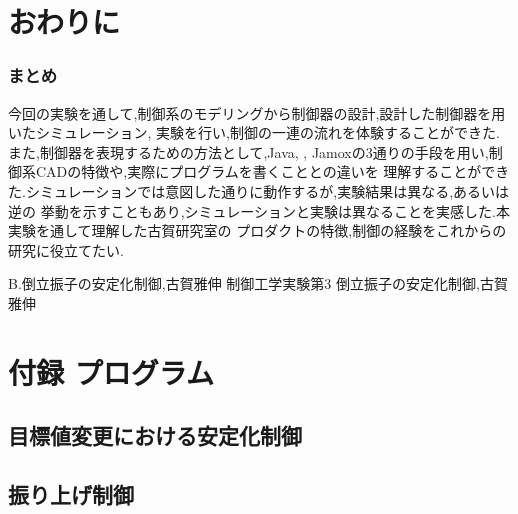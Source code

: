 \chapter{おわりに}
\subsection{まとめ}
今回の実験を通して,制御系のモデリングから制御器の設計,設計した制御器を用いたシミュレーション,
実験を行い,制御の一連の流れを体験することができた.また,制御器を表現するための方法として,Java,
\MaTX{}, Jamoxの3通りの手段を用い,制御系CADの特徴や,実際にプログラムを書くこととの違いを
理解することができた.シミュレーションでは意図した通りに動作するが,実験結果は異なる,あるいは逆の
挙動を示すこともあり,シミュレーションと実験は異なることを実感した.本実験を通して理解した古賀研究室の
プロダクトの特徴,制御の経験をこれからの研究に役立てたい.

\begin{thebibliography}{2}
 B.倒立振子の安定化制御,古賀雅伸
 制御工学実験第3 倒立振子の安定化制御,古賀雅伸
\end{thebibliography}


\chapter{付録 プログラム}

\section{目標値変更における安定化制御}


\section{振り上げ制御}


